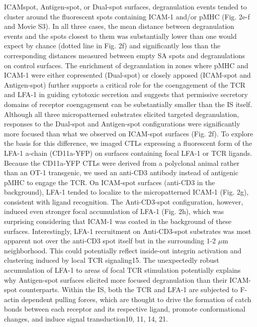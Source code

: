 ICAMspot, Antigen-spot, or Dual-spot surfaces, degranulation events tended to cluster around the fluorescent spots containing ICAM-1 and/or pMHC (Fig. 2e-f and Movie S3). In all three cases, the mean distance between degranulation events and the spots closest to them was substantially lower than one would expect by chance (dotted line in Fig. 2f) and significantly less than the corresponding distances measured between empty SA spots and degranulations on control surfaces. The enrichment of degranulation in zones where pMHC and ICAM-1 were either copresented (Dual-spot) or closely apposed (ICAM-spot and Antigen-spot) further supports a critical role for the coengagement of the TCR and LFA-1 in guiding cytotoxic secretion and suggests that permissive secretory domains of receptor coengagement can be substantially smaller than the IS itself. Although all three micropatterned substrates elicited targeted degranulation, responses to the Dual-spot and Antigen-spot configurations were significantly more focused than what we observed on ICAM-spot surfaces (Fig. 2f). To explore the basis for this difference, we imaged CTLs expressing a fluorescent form of the LFA-1 a-chain (CD11a-YFP) on surfaces containing focal LFA-1 or TCR ligands. Because the CD11a-YFP CTLs were derived from a polyclonal animal rather than an OT-1 transgenic, we used an anti-CD3 antibody instead of antigenic pMHC to engage the TCR. On ICAM-spot surfaces (anti-CD3 in the background), LFA-1 tended to localize to the micropatterned ICAM-1 (Fig. 2g), consistent with ligand recognition. The Anti-CD3-spot configuration, however, induced even stronger focal accumulation of LFA-1 (Fig. 2h), which was surprising considering that ICAM-1 was coated in the background of these surfaces. Interestingly, LFA-1 recruitment on Anti-CD3-spot substrates was most apparent not over the anti-CD3 spot itself but in the surrounding 1-2 $\mu$m neighborhood. This could potentially reflect inside-out integrin activation and clustering induced by local TCR signaling15. The unexpectedly robust accumulation of LFA-1 to areas of focal TCR stimulation potentially explains why Antigen-spot surfaces elicited more focused degranulation than their ICAM-spot counterparts. Within the IS, both the TCR and LFA-1 are subjected to F-actin dependent pulling forces, which are thought to drive the formation of catch bonds between each receptor and its respective ligand, promote conformational changes, and induce signal transduction10, 11, 14, 21. 

